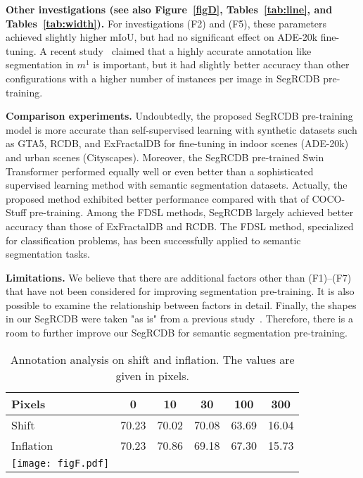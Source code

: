 \documentclass[10pt,twocolumn,letterpaper]{article}
\begin{document}
\noindent \textbf{Other investigations (see also Figure~\ref{figD}, Tables~\ref{tab:line}, and Tables~\ref{tab:width}).} For investigations (F2) and (F5), these parameters achieved slightly higher mIoU, but had no significant effect on ADE-20k fine-tuning. A recent study~\cite{qin2022} claimed that a highly accurate annotation like  segmentation in ${m}^{1}$ is important, but it had slightly better accuracy than other configurations with a higher number of instances per image in SegRCDB pre-training.


\noindent \textbf{Comparison experiments.} Undoubtedly, the proposed SegRCDB pre-training model is more accurate than self-supervised learning with synthetic datasets such as GTA5, RCDB, and ExFractalDB for fine-tuning in indoor scenes (ADE-20k) and urban scenes (Cityscapes). Moreover, the SegRCDB pre-trained Swin Transformer performed equally well or even better than a sophisticated supervised learning method with semantic segmentation datasets. Actually, the proposed method exhibited better performance compared with that of COCO-Stuff pre-training. Among the FDSL methods, SegRCDB largely achieved better accuracy than those of ExFractalDB and RCDB. The FDSL method, specialized for classification problems, has been successfully applied to semantic segmentation tasks.

\noindent \textbf{Limitations.} We believe that there are additional factors other than (F1)--(F7) that have not been considered for improving segmentation pre-training.  It is also possible to examine the relationship between factors in detail. Finally, the shapes in our SegRCDB were taken "as is" from a previous study~\cite{Kataoka_2022_CVPR}. Therefore, there is a room to further improve our SegRCDB for semantic segmentation pre-training.

\begin{table}
  \centering
  \caption{Annotation analysis on shift and inflation. The values are given in pixels.}
  \begin{tabular}{lccccc}
    \toprule
     Pixels  & 0 & 10 & 30 & 100 & 300\\
    \midrule
       Shift & 70.23& 70.02 & 70.08 & 63.69 &16.04\\
       Inflation & 70.23 & 70.86 & 69.18 & 67.30 &  15.73 \\
    \midrule
    \begin{minipage}{.15\linewidth}
    \centering
    \texttt{[image: figF.pdf]}
    \end{minipage} \\ 
  \bottomrule
  \end{tabular}
  \vspace{-10pt}
  \label{tab:annotation_analysis}
\end{table}
\end{document}
